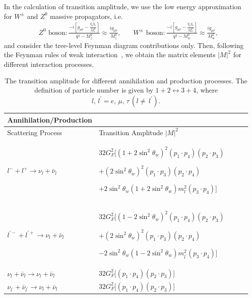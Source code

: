 In the calculation of transition amplitude, we use the low energy approximation for $W^\pm$ and $Z^0$ massive propagators, i.e.
\begin{align}
&\mbox{$Z^0$ boson}:\frac{-i\left[g_{\mu\nu}-\frac{q_\mu q_\nu}{M^2_z}\right]}{q^2-M^2_z}\approx\frac{ig_{\mu\nu}}{M^2_z},\quad
&\mbox{$W^\pm$ boson}:\frac{-i\left[g_{\mu\nu}-\frac{q_\mu q_\nu}{M^2_w}\right]}{q^2-M^2_w}\approx\frac{ig_{\mu\nu}}{M^2_w},
\end{align}
and consider the tree-level Feynman diagram contributions only. Then, following the Feynman rules of weak interaction~\cite{Griffiths:2008zz}, we obtain the matrix elements $|M|^2$ for different interaction processes.
\begin{table}[h]
\centering
\begin{tabular}{lp{8cm}lp{8cm}l}
\hline\hline
Annihilation/Production \\
\hline\hline
Scattering Process & Transition Amplitude $|M|^2$ \\
\hline
$l^-+l^+\longrightarrow\nu_l+\bar{\nu}_l$ &$ 32G^2_F\bigg[\left(1+2\sin^2\theta_w\right)^2\left(p_1\cdot p_4\right)\left(p_2\cdot p_3\right)$

$+\left(2\sin^2\theta_w\right)^2\left(p_1\cdot p_3\right)\left(p_2\cdot p_4\right)$

$+2\sin^2\theta_w\left(1+2\sin^2\theta_w\right)m^2_l\left(p_3\cdot p_4\right)\bigg]$ \\
\hline
$l^{\prime-}+l^{\prime+}\longrightarrow\nu_l+\bar{\nu}_l$ & $32G^2_F\bigg[\left(1-2\sin^2\theta_w\right)^2\left(p_1\cdot p_4\right)\left(p_2\cdot p_3\right)$

$+\left(2\sin^2\theta_w\right)^2\left(p_1\cdot p_3\right)\left(p_2\cdot p_4\right)$

$-2\sin^2\theta_w\left(1-2\sin^2\theta_w\right)m^2_{l^\prime}\left(p_3\cdot p_4\right)\bigg]$ \\
\hline
$\nu_l+\bar{\nu}_l\longrightarrow\nu_l+\bar{\nu}_l$ &
$32G^2_F\bigg[\left(p_1\cdot p_4\right)\left(p_2\cdot p_3\right)\bigg]$ \\
\hline
$\nu_{l^\prime}+\bar{\nu}_{l^\prime}\longrightarrow\nu_l+\bar{\nu}_l$ &
$32G^2_F\bigg[\left(p_1\cdot p_4\right)\left(p_2\cdot p_3\right)\bigg]$ \\
\hline\hline
\end{tabular}
\caption{The transition amplitude for different annihilation and production processes. The definition of particle number is given by $1+2\leftrightarrow3+4$, where $l,\,l^\prime=e,\,\mu,\,\tau\,(l\neq\,l^\prime)$.}
\label{T005}
\end{table}
